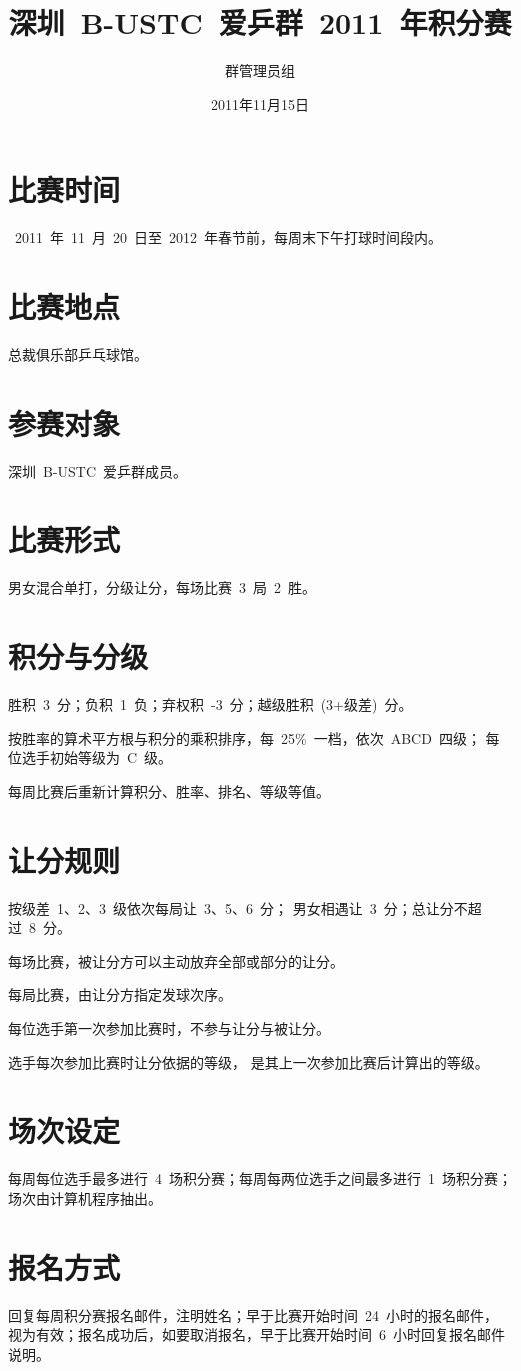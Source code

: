 \documentclass[11pt]{article}
\title{深圳~B-USTC~爱乒群~2011~年积分赛}
\author{\CK 群管理员组}
\date{\CK 2011年11月15日}     %
\begin{document}
\CW
\maketitle

\CS
\section{\CW 比赛时间}
\par ~2011~年~11~月~20~日至~2012~年春节前，每周末下午打球时间段内。

\section{\CW 比赛地点}
\par 总裁俱乐部乒乓球馆。

\section{\CW 参赛对象}
\par 深圳~B-USTC~爱乒群成员。

\section{\CW 比赛形式}
\par 男女混合单打，分级让分，每场比赛~3~局~2~胜。

\section{\CW 积分与分级}
\par 胜积~3~分；负积~1~负；弃权积~-3~分；越级胜积~(3+级差)~分。
\par 按胜率的算术平方根与积分的乘积排序，每~25\%~一档，依次~ABCD~四级；
每位选手初始等级为~C~级。
\par 每周比赛后重新计算积分、胜率、排名、等级等值。

\section{\CW 让分规则}
\par 按级差~1、2、3~级依次每局让~3、5、6~分；
男女相遇让~3~分；总让分不超过~8~分。
\par 每场比赛，被让分方可以主动放弃全部或部分的让分。
\par 每局比赛，由让分方指定发球次序。
\par 每位选手第一次参加比赛时，不参与让分与被让分。
\par 选手每次参加比赛时让分依据的等级，
是其上一次参加比赛后计算出的等级。

\section{\CW 场次设定}
\par 每周每位选手最多进行~4~场积分赛；每周每两位选手之间最多进行~1~场积分赛；
场次由计算机程序抽出。

\section{\CW 报名方式}
\par 回复每周积分赛报名邮件，注明姓名；早于比赛开始时间~24~小时的报名邮件，
视为有效；报名成功后，如要取消报名，早于比赛开始时间~6~小时回复报名邮件说明。
\end{document}
